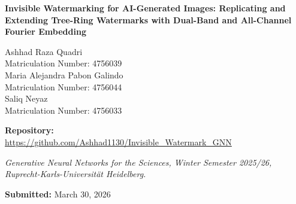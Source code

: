 \documentclass[10pt,twocolumn]{article}
\begin{document}
\begin{titlepage}
    \centering
    
    \vspace*{2cm}
    
    {\LARGE \textbf{Invisible Watermarking for AI-Generated Images: Replicating and Extending Tree-Ring Watermarks with Dual-Band and All-Channel Fourier Embedding}\par}
    
    \vspace{2cm}
    
    {\large
    Ashhad Raza Quadri\\
    Matriculation Number: 4756039\\[0.5cm]
    Maria Alejandra Pabon Galindo\\
    Matriculation Number: 4756044\\[0.5cm]
    Saliq Neyaz\\
    Matriculation Number: 4756033
    \par}
    
    \vspace{2.5cm}
    
    {\large
    \textbf{Repository:} \\
    \url{https://github.com/Ashhad1130/Invisible_Watermark_GNN}
    \par}
    
    \vspace{2.5cm}
    
    {\large
    \textit{Generative Neural Networks for the Sciences,
    Winter Semester 2025/26,
    Ruprecht-Karls-Universit\"at Heidelberg.}
    \par}
    
    \vspace{3cm}
    
    {\large
    \textbf{Submitted:} March 30, 2026
    \par}
    
    \vfill
\end{titlepage}

\onecolumn

\noindent\hrulefill\vspace{4pt}
\end{document}
